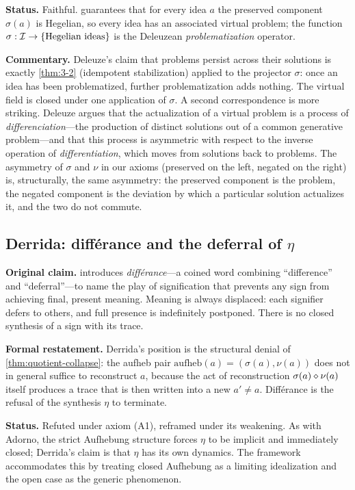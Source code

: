 \textbf{Status.} Faithful.  guarantees that for
every idea $a$ the preserved component $\sigma(a)$ is Hegelian, so
every idea has an associated virtual problem; the function
$\sigma:\mathcal{I}\to\{\text{Hegelian ideas}\}$ is the Deleuzean
\emph{problematization} operator.

\textbf{Commentary.} Deleuze's claim that problems persist across
their solutions is exactly \cref{thm:3-2} (idempotent stabilization)
applied to the projector $\sigma$: once an idea has been
problematized, further problematization adds nothing. The virtual
field is closed under one application of $\sigma$.  A second
correspondence is more striking. Deleuze argues
\citep[ch.~IV]{Deleuze1968} that the actualization of a virtual
problem is a process of \emph{differenciation}---the production of
distinct solutions out of a common generative problem---and that
this process is asymmetric with respect to the inverse operation of
\emph{differentiation}, which moves from solutions back to problems.
The asymmetry of $\sigma$ and $\nu$ in our axioms (preserved on the
left, negated on the right) is, structurally, the same asymmetry: the
preserved component is the problem, the negated component is the
deviation by which a particular solution actualizes it, and the two
do not commute.

\subsection*{Derrida: différance and the deferral of $\eta$}

\textbf{Original claim.} \citet{Derrida1967} introduces
\emph{différance}---a coined word combining ``difference'' and
``deferral''---to name the play of signification that prevents any
sign from achieving final, present meaning. Meaning is always
displaced: each signifier defers to others, and full presence is
indefinitely postponed. There is no closed synthesis of a sign with
its trace.

\textbf{Formal restatement.} Derrida's position is the structural
denial of \cref{thm:quotient-collapse}: the aufheb pair
$\mathrm{aufheb}(a)=(\sigma(a),\nu(a))$ does not in general suffice to
reconstruct $a$, because the act of reconstruction
$\sigma(a)\mathbin{\diamond}\nu(a)$ itself produces a trace that is then
written into a new $a'\neq a$. Différance is the refusal of the
synthesis $\eta$ to terminate.

\textbf{Status.} Refuted under axiom (A1), reframed under its
weakening. As with Adorno, the strict Aufhebung structure forces
$\eta$ to be implicit and immediately closed; Derrida's claim is that
$\eta$ has its own dynamics. The framework accommodates this by
treating closed Aufhebung as a limiting idealization and the open
case as the generic phenomenon.

